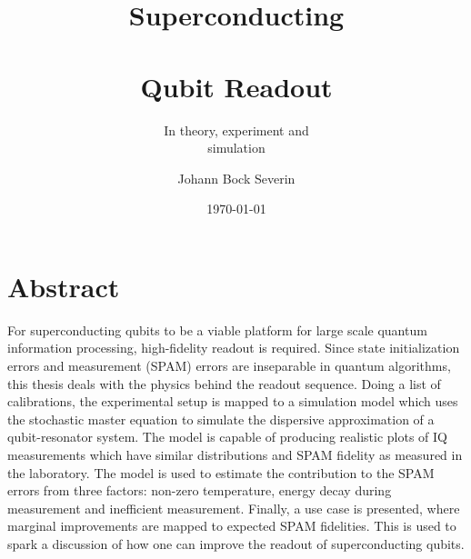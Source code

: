 


\title{Superconducting \\ \\Qubit Readout}
\author{Johann Bock Severin}
\subtitle{In theory, experiment and \\simulation}
\date{\today}


% 
\BgThispage
\maketitlepage

\listoftodos
\chapter*{\centering Abstract}
For superconducting qubits to be a viable platform for large scale quantum information processing, high-fidelity readout is required. Since state initialization errors and measurement (SPAM) errors are inseparable in quantum algorithms, this thesis deals with the physics behind the readout sequence. Doing a list of calibrations, the experimental setup is mapped to a simulation model which uses the stochastic master equation to simulate the dispersive approximation of a qubit-resonator system. The model is capable of producing realistic plots of IQ measurements which have similar distributions and SPAM fidelity as measured in the laboratory. The model is used to estimate the contribution to the SPAM errors from three factors: non-zero temperature, energy decay during measurement and inefficient measurement. Finally, a use case is presented, where marginal improvements are mapped to expected SPAM fidelities. This is used to spark a discussion of how one can improve the readout of superconducting qubits.






